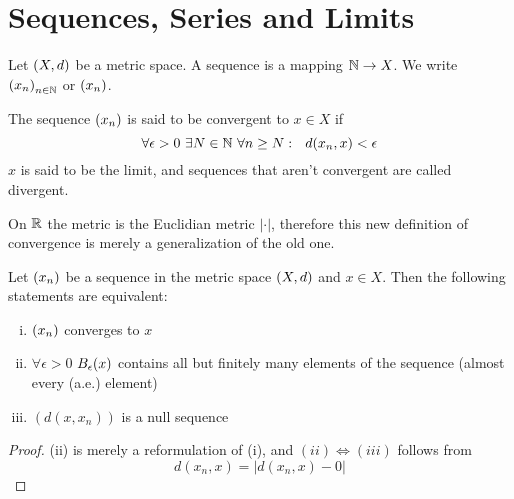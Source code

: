 \documentclass[../../script.tex]{subfiles}
\begin{document}
\section{Sequences, Series and Limits}

\begin{defi}
    Let $(X, d)$ be a metric space. A sequence is a mapping $\mathbb{N} \rightarrow X$. We write $\left(x_n\right)_{n \in \mathbb{N}}$ or $\left(x_n\right)$.

    The sequence $\left(x_n\right)$ is said to be convergent to $x \in X$ if
    \[
        \forall \epsilon > 0 ~\exists N \in \mathbb{N} ~\forall n \ge N: ~~d(x_n, x) < \epsilon
    \]
    $x$ is said to be the limit, and sequences that aren't convergent are called divergent.
\end{defi}

\begin{rem}
    On $\mathbb{R}$ the metric is the Euclidian metric $|\cdot|$, therefore this new definition of convergence is merely a generalization of the old one.
\end{rem}

\begin{thm}
    Let $\left(x_n\right)$ be a sequence in the metric space $(X, d)$ and $x \in X$. Then the following statements are equivalent:
    \begin{enumerate}[(i)]
        \item $\left(x_n\right)$ converges to $x$
        \item $\forall \epsilon > 0$ $B_{\epsilon}(x)$ contains all but finitely many elements of the sequence (almost every (a.e.) element)
        \item $(d(x, x_n))$ is a null sequence
    \end{enumerate}
\end{thm}
\begin{proof}
    (ii) is merely a reformulation of (i), and $(ii) \iff (iii)$ follows from
    \begin{equation}
        d(x_n, x) = |d(x_n, x) - 0|
    \end{equation}
\end{proof}
\end{document}
